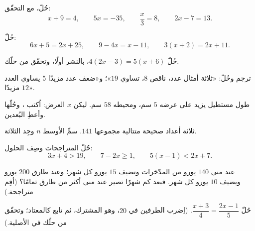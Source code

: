 \begin{exercise}[$\star$]\label{exo:g8:equations:4}
حُلّ، مع التحقّق:
\[
x + 9 = 4, \qquad
5x = -35, \qquad
\frac{x}{3} = 8, \qquad
2x - 7 = 13 .
\]
\end{exercise}

\begin{exercise}[$\star$]\label{exo:g8:equations:5}
حُلّ:
\[
6x + 5 = 2x + 25, \qquad
9 - 4x = x - 11, \qquad
3(x + 2) = 2x + 11 .
\]
\end{exercise}

\begin{exercise}[$\star$]\label{exo:g8:equations:6}
حُلّ $4(2x - 3) = 5(x + 6)$، بالنشر أولًا، وتحقّق من
حلّك.
\end{exercise}

\begin{exercise}[$\star$]\label{exo:g8:equations:7}
ترجم وحُلّ: «ثلاثة أمثال عدد، ناقص $8$، تساوي
$19$»؛ و«ضعف عدد مزيدًا $5$ يساوي العدد
مزيدًا $12$».
\end{exercise}

\begin{exercise}[$\star\star$]\label{exo:g8:equations:8}
طول مستطيل يزيد على عرضه $5$ سم، ومحيطه
$58$ سم. ليكن $x$ العرض: اُكتب ، وحُلّها وأعطِ
البُعدين.
\end{exercise}

\begin{exercise}[$\star\star$]\label{exo:g8:equations:9}
ثلاثة أعداد صحيحة متتالية مجموعها $141$. سمِّ الأوسط
$n$ وجِد الثلاثة.
\end{exercise}

\begin{exercise}[$\star\star$]\label{exo:g8:equations:10}
حُلّ المتراجحات وصِف الحلول:
\[
3x + 4 > 19, \qquad
7 - 2x \geq 1, \qquad
5(x - 1) < 2x + 7 .
\]
\end{exercise}

\begin{exercise}[$\star\star$]\label{exo:g8:equations:11}
عند منى $140$ يورو من المدّخرات وتضيف $15$ يورو كل شهر؛ وعند طارق
$200$ يورو ويضيف $10$ يورو كل شهر. فبعد كم شهرًا
تصير عند منى أكثر من طارق تمامًا؟ (أقِم متراجحة.)
\end{exercise}

\begin{exercise}[$\star\star\star$]\label{exo:g8:equations:12}
حُلّ  $\dfrac{x + 3}{4} = \dfrac{2x - 1}{5}$.
(اِضرب الطرفين في $20$، وهو  المشترك، ثم تابع كالمعتاد؛
وتحقّق من حلّك في  الأصلية.)
\end{exercise}

